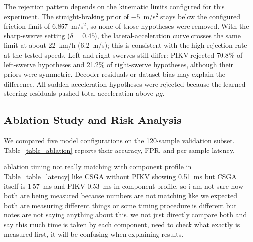 The rejection pattern depends on the kinematic limits configured for this experiment. The straight-braking prior of $-5$~m/s$^2$ stays below the configured friction limit of $6.867$~m/s$^2$, so none of those hypotheses were removed. With the sharp-swerve setting ($\delta = 0.45$), the lateral-acceleration curve crosses the same limit at about 22~km/h (6.2~m/s); this is consistent with the high rejection rate at the tested speeds. Left and right swerves still differ: PIKV rejected 70.8\% of left-swerve hypotheses and 21.2\% of right-swerve hypotheses, although their priors were symmetric. Decoder residuals or dataset bias may explain the difference. All sudden-acceleration hypotheses were rejected because the learned steering residuals pushed total acceleration above $\mu g$.

\subsection{Ablation Study and Risk Analysis}
We compared five model configurations on the 120-sample validation subset. Table~\ref{table_ablation} reports their accuracy, FPR, and per-sample latency.

\begin{table}[H]
\caption{Ablation study on the 120-sample validation split (anomaly threshold CRT $> 0.4$).}
\centering
\label{table_ablation}
\end{table}

ablation timing not really matching with component profile in Table~\ref{table_latency} like CSGA without PIKV showing 0.51~ms but CSGA itself is 1.57~ms and PIKV 0.53~ms in component profile, so i am not sure how both are being measured because numbers are not matching like we expected  both are measuring different things or some timing procedure is different but notes are not saying anything about this. we  not just directly compare both and say this much time is taken by each component, need to check what exactly is measured first, it will be confusing when explaining results.

